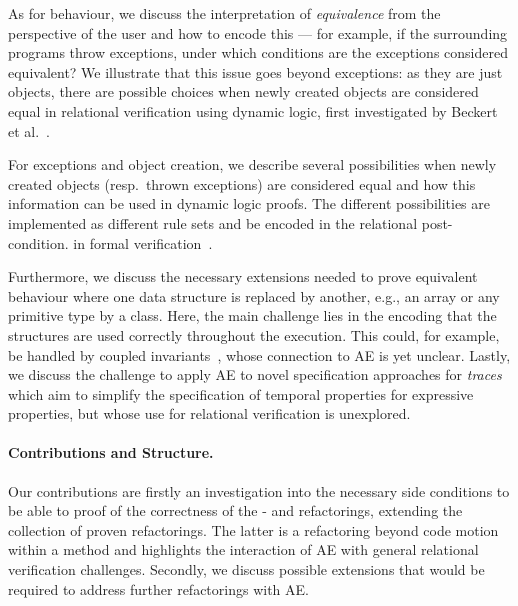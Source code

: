 As for behaviour, we discuss the interpretation of \textit{equivalence} from the perspective of the user and how to encode this --- for example, if the surrounding programs throw exceptions, under which conditions are the exceptions considered equivalent?
We illustrate that this issue goes beyond exceptions:
as they are just objects, there are possible choices when newly created objects are considered equal in relational verification using dynamic logic, 
first investigated by Beckert et al.~\cite{DBLP:conf/lopstr/BeckertBKSSU13}.



For exceptions and object creation, we describe several possibilities when newly created objects (resp.\ thrown exceptions) are considered equal
and how this information can be used in dynamic logic proofs. The different possibilities are implemented as different rule sets and  be encoded in the relational post-condition.
 in formal verification~\cite{DBLP:journals/corr/abs-1211-6186,DBLP:series/lncs/HahnleH19}.


Furthermore, we discuss the necessary extensions needed to prove equivalent behaviour where one data structure is replaced by another, e.g., an array or any primitive type by a class.
Here, the main challenge lies in the encoding that the structures are used correctly throughout the execution.
This could, for example, be handled by coupled invariants~\cite{DBLP:conf/birthday/BeckertU18}, whose connection to AE is yet unclear. 
Lastly, we discuss the challenge to apply AE to novel specification approaches for \emph{traces} which aim to simplify the specification of temporal properties for expressive properties, but whose use for relational verification is unexplored.

\paragraph{Contributions and Structure.}
Our contributions are firstly an investigation into the necessary side conditions to be able to proof of the correctness of the - and  refactorings, extending the collection of proven refactorings.
The latter is a refactoring beyond code motion within a method and highlights the interaction of AE with general relational verification challenges.
Secondly, we discuss possible extensions that would be required to address further refactorings with AE.

